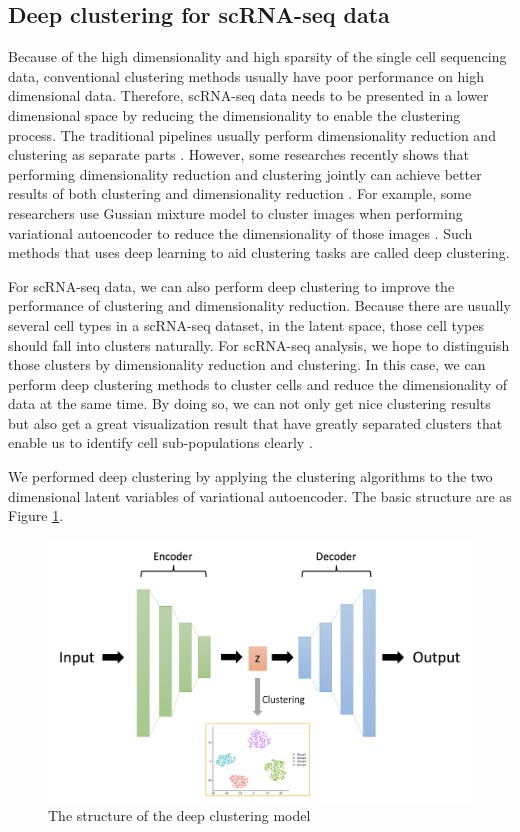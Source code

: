 \subsection{Deep clustering for scRNA-seq data}
Because of the high dimensionality and high sparsity of the single cell sequencing data, conventional clustering methods usually have poor performance on high dimensional data. Therefore, scRNA-seq data needs to be presented in a lower dimensional space by reducing the dimensionality to enable the clustering process. The traditional pipelines usually perform dimensionality reduction and clustering as separate parts \cite{wu2020tools}. However, some researches recently shows that performing dimensionality reduction and clustering jointly can achieve better results of both clustering and dimensionality reduction \cite{yang2017towards}. For example, some researchers use Gussian mixture model to cluster images when performing variational autoencoder to reduce the dimensionality of those images \cite{prasad2020variational}. Such methods that uses deep learning to aid clustering tasks are called deep clustering.

For scRNA-seq data, we can also perform deep clustering to improve the performance of clustering and dimensionality reduction. Because there are usually several cell types in a scRNA-seq dataset, in the latent space, those cell types should fall into clusters naturally. For scRNA-seq analysis, we hope to distinguish those clusters by dimensionality reduction and clustering. In this case, we can perform deep clustering methods to cluster cells and reduce the dimensionality of data at the same time. By doing so, we can not only get nice clustering results but also get a great visualization result that have greatly separated clusters that enable us to identify cell sub-populations clearly \cite{tian2019clustering}. 

We performed deep clustering by applying the clustering algorithms to the two dimensional latent variables of variational autoencoder. The basic structure are as Figure \ref{dcstru}. 

\begin{figure}[htb!]
    \centering
    \includegraphics[width=1\textwidth]{figures/myfigures/dc.png}
    \caption{The structure of the deep clustering model}
    \label{dcstru}
\end{figure}


